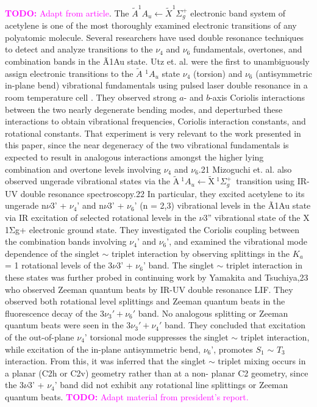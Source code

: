 \documentclass[12pt,draft]{mitthesis}
\newcommand{\TODO} [1]{\textcolor{magenta}{\textbf{TODO:} #1}}
\newcommand{\POINT}[1]{\textcolor{magenta}{#1}}
\newcommand{\AtoX}{$
  \tilde{\text{A}} \: ^1\!A_u 
  \leftarrow 
  \tilde{\text{X}} \: ^1\Sigma_g^+
  $}
\begin{document}
\TODO{Adapt from article}.  The $\tilde{A} ^1A_u \leftarrow \tilde{X}
^1\Sigma_g^+$ electronic band system of acetylene is one of the most
thoroughly examined electronic transitions of any polyatomic molecule.
Several researchers have used double resonance techniques to detect
and analyze transitions to the $\nu_4$ and $\nu_6$ fundamentals,
overtones, and combination bands in the Ã1Au state. Utz et. al. were
the first to unambiguously assign electronic transitions to the
$\tilde{A}$ $^1A_u$ state $\nu_4$ (torsion) and $\nu_6$ (antisymmetric
in-plane bend) vibrational fundamentals using pulsed laser double
resonance in a room temperature cell \cite{utz93}.  They observed
strong $a$- and $b$-axis Coriolis interactions between the two nearly
degenerate bending modes, and deperturbed these interactions to obtain
vibrational frequencies, Coriolis interaction constants, and
rotational constants.  That experiment is very relevant to the work
presented in this paper, since the near degeneracy of the two
vibrational fundamentals is expected to result in analogous
interactions amongst the higher lying combination and overtone levels
involving $\nu_4$ and $\nu_6$.21 Mizoguchi et. al. also observed
ungerade vibrational states via the \AtoX\ transition using IR-UV
double resonance spectroscopy.22 In particular, they excited acetylene
to its ungerade n$\nu$3' + $\nu_4$' and n$\nu$3' + $\nu_6$' (n = 2,3)
vibrational levels in the Ã1Au state via IR excitation of selected
rotational levels in the $\nu$3” vibrational state of the X 1Σg+
electronic ground state.  They investigated the Coriolis coupling
between the combination bands involving $\nu_4$' and $\nu_6$', and
examined the vibrational mode dependence of the singlet $\sim$ triplet
interaction by observing splittings in the $K_a$ = 1 rotational levels
of the 3$\nu$3' + $\nu_6$' band. The singlet $\sim$ triplet
interaction in these states was further probed in continuing work by
Yamakita and Tsuchiya,23 who observed Zeeman quantum beats by IR-UV
double resonance LIF. They observed both rotational level splittings
and Zeeman quantum beats in the fluorescence decay of the $3\nu_3' +
\nu_6'$ band.  No analogous splitting or Zeeman quantum beats were
seen in the $3\nu_3' + \nu_4'$ band. They concluded that excitation of
the out-of-plane $\nu_4$' torsional mode suppresses the singlet $\sim$
triplet interaction, while excitation of the in-plane antisymmetric
bend, $\nu_6$', promotes $S_1$ $\sim$ $T_3$ interaction. From this, it
was inferred that the singlet $\sim$ triplet mixing occurs in a planar
(C2h or C2v) geometry rather than at a non- planar C2 geometry, since
the 3$\nu$3' + $\nu_4$' band did not exhibit any rotational line
splittings or Zeeman quantum beats.  \TODO{Adapt material from
  president's report.}
\end{document}
